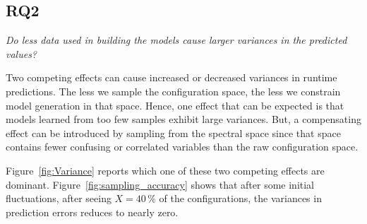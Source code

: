 \documentclass{newsig}
\newcommand{\fig}[1]{Figure~\ref{fig:#1}}
\begin{document}
\subsection{RQ2}

\begin{center}
{\em
Do less data used in building the models cause larger variances in the predicted values?}
\end{center}


Two competing effects can cause increased or decreased  variances in 
runtime predictions.
The   less we sample the configuration space,
the less we constrain model generation in that space. Hence, one effect that can be expected
is that models learned
from too few samples exhibit large variances. 
But,
a  compensating effect can be introduced by sampling from the spectral space
since that space contains fewer confusing or correlated variables than the raw configuration space.

\fig{Variance} reports which one of these two competing effects are dominant. 
\fig{sampling_accuracy} shows that after some initial fluctuations,
after seeing $X=40$\,\% of the configurations, the variances in prediction errors reduces to nearly zero.
\end{document}
